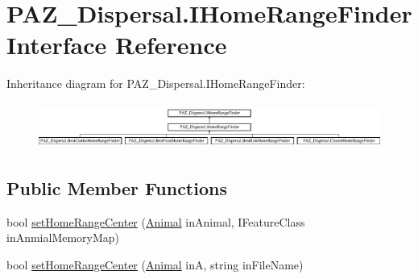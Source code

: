 \hypertarget{interface_p_a_z___dispersal_1_1_i_home_range_finder}{\section{P\-A\-Z\-\_\-\-Dispersal.\-I\-Home\-Range\-Finder Interface Reference}
\label{interface_p_a_z___dispersal_1_1_i_home_range_finder}
}
Inheritance diagram for P\-A\-Z\-\_\-\-Dispersal.\-I\-Home\-Range\-Finder\-:\begin{figure}[H]
\begin{center}
\leavevmode
\includegraphics[height=1.510791cm]{interface_p_a_z___dispersal_1_1_i_home_range_finder}
\end{center}
\end{figure}
\subsection*{Public Member Functions}
\begin{DoxyCompactItemize}
\item 
bool \hyperlink{interface_p_a_z___dispersal_1_1_i_home_range_finder_ac0b229161279661ed85336b891288cac}{set\-Home\-Range\-Center} (\hyperlink{class_p_a_z___dispersal_1_1_animal}{Animal} in\-Animal, I\-Feature\-Class in\-Anmial\-Memory\-Map)
\item 
bool \hyperlink{interface_p_a_z___dispersal_1_1_i_home_range_finder_a77690100a57b1b23e8bc13cfcc7a17f4}{set\-Home\-Range\-Center} (\hyperlink{class_p_a_z___dispersal_1_1_animal}{Animal} in\-A, string in\-File\-Name)
\end{DoxyCompactItemize}


